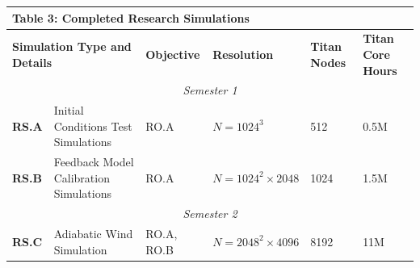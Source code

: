\documentclass[11pt,letterpaper,english]{article}
\begin{document}
\begin{table}[h]
\vspace{-.12in}
\begin{tabular}{|l|p{2.5in}|p{0.7in}|p{0.7in}|p{0.5in}|p{0.7in}|} 
\multicolumn{6}{l}{\bf{Table 3: Completed Research Simulations}}\\
\hline
\multicolumn{2}{|l|}{\bf Simulation Type and Details} & {\bf Objective} & {\bf Resolution} & {\bf Titan Nodes} & {\bf Titan Core Hours} \\ \hline
\multicolumn{6}{|c|}{\it Semester 1} \\ \hline
\textbf{RS.A} & Initial Conditions Test Simulations & RO.A & $N=1024^3$ &512&0.5M\\ \hline
\textbf{RS.B} & Feedback Model Calibration Simulations & RO.A & $N=1024^2\times2048$ &1024&1.5M\\ \hline
\multicolumn{6}{|c|}{\it Semester 2} \\ \hline
\textbf{RS.C} & Adiabatic Wind Simulation & RO.A, RO.B & $N=2048^2\times4096$ &8192&11M\\ \hline
\end{tabular}
\end{table}

\end{document}

